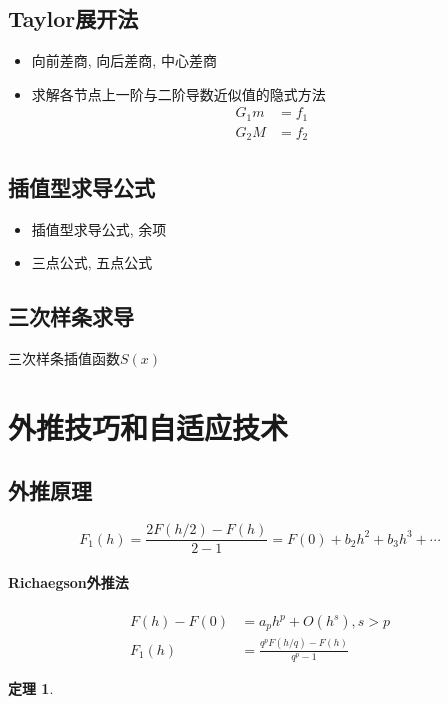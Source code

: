 \documentclass[twoside]{article}
\newtheorem{theorem}{定理}[section]
\begin{document}
\subsection{Taylor展开法}
\begin{itemize}
  \item 向前差商, 向后差商, 中心差商
  \item 求解各节点上一阶与二阶导数近似值的隐式方法
    \begin{equation}
      \begin{aligned}
        G_1m&=f_1 \\
        G_2M&=f_2
      \end{aligned}
    \end{equation}
\end{itemize}
\subsection{插值型求导公式}
\begin{itemize}
  \item 插值型求导公式, 余项
  \item 三点公式, 五点公式
\end{itemize}
\subsection{三次样条求导}
三次样条插值函数$S(x)$

\section{外推技巧和自适应技术}
\subsection{外推原理}
\begin{equation}
  F_1(h)=\frac{2F(h/2)-F(h)}{2-1}=F(0)+b_2h^2 + b_3h^3+\cdots
\end{equation}
\paragraph{Richaegson外推法}
\begin{equation}
  \begin{aligned}
    F(h)-F(0)&=a_p h^p + O(h^s), s>p \\
    F_1(h) &= \frac{q^pF(h/q)-F(h)}{q^p-1}
  \end{aligned}
\end{equation}
\begin{theorem}
\end{theorem}
\end{document}
